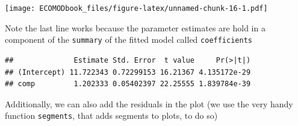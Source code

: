 \documentclass[
]{book}
\newenvironment{Shaded}{\begin{snugshade}}{\end{snugshade}}
\newcommand{\CommentTok}[1]{\textcolor[rgb]{0.56,0.35,0.01}{\textit{#1}}}
\newcommand{\DataTypeTok}[1]{\textcolor[rgb]{0.13,0.29,0.53}{#1}}
\newcommand{\DecValTok}[1]{\textcolor[rgb]{0.00,0.00,0.81}{#1}}
\newcommand{\FloatTok}[1]{\textcolor[rgb]{0.00,0.00,0.81}{#1}}
\newcommand{\KeywordTok}[1]{\textcolor[rgb]{0.13,0.29,0.53}{\textbf{#1}}}
\newcommand{\NormalTok}[1]{#1}
\newcommand{\OperatorTok}[1]{\textcolor[rgb]{0.81,0.36,0.00}{\textbf{#1}}}
\newcommand{\StringTok}[1]{\textcolor[rgb]{0.31,0.60,0.02}{#1}}
\begin{document}
\begin{Shaded}
\end{Shaded}

\texttt{[image: ECOMODbook\_files/figure-latex/unnamed-chunk-16-1.pdf]}

Note the last line works because the parameter estimates are hold in a component of the \texttt{summary} of the fitted model called \texttt{coefficients}

\begin{Shaded}
\end{Shaded}

\begin{verbatim}
##              Estimate Std. Error  t value     Pr(>|t|)
## (Intercept) 11.722343 0.72299153 16.21367 4.135172e-29
## comp         1.202333 0.05402397 22.25555 1.839784e-39
\end{verbatim}

Additionally, we can also add the residuals in the plot (we use the very handy function \texttt{segments}, that adds segments to plots, to do so)
\end{document}
